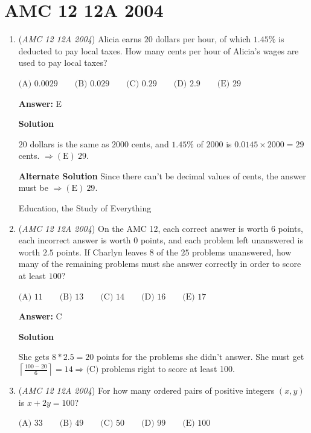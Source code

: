 \section{AMC 12 12A 2004}
        \begin{enumerate}
        	\item (\textit{AMC 12 12A 2004}) Alicia earns $20$ dollars per hour, of which $1.45\%$ is deducted to pay local taxes.  How many cents per hour of Alicia's wages are used to pay local taxes?


 $\text{(A) } 0.0029 \qquad \text{(B) } 0.029 \qquad \text{(C) } 0.29 \qquad \text{(D) } 2.9 \qquad \text{(E) } 29$

 \textbf{Answer: }E



\textbf{Solution}

$20$ dollars is the same as $2000$ cents, and $1.45\%$ of $2000$ is $0.0145\times2000=29$ cents. $\Rightarrow\boxed{\mathrm{(E)}\ 29}$.

 \textbf{Alternate Solution} Since there can't be decimal values of cents, the answer must be $\Rightarrow\boxed{\mathrm{(E)}\ 29}$. 

 Education, the Study of Everything

 


	\item (\textit{AMC 12 12A 2004}) On the AMC 12, each correct answer is worth $6$ points, each incorrect answer is worth $0$ points, and each problem left unanswered is worth $2.5$ points. If Charlyn leaves $8$ of the $25$ problems unanswered, how many of the remaining problems must she answer correctly in order to score at least $100$?


 $\text{(A) } 11 \qquad \text{(B) } 13 \qquad \text{(C) } 14 \qquad \text{(D) } 16 \qquad \text{(E) } 17$

 \textbf{Answer: }C



\textbf{Solution}

She gets $8*2.5=20$ points for the problems she didn't answer. She must get $\left\lceil \frac{100-20}{6} \right\rceil =14 \Rightarrow \text {(C)}$ problems right to score at least 100.

 


	\item (\textit{AMC 12 12A 2004}) For how many ordered pairs of positive integers $(x,y)$ is $x+2y=100$? 


 $\text{(A) } 33 \qquad \text{(B) } 49 \qquad \text{(C) } 50 \qquad \text{(D) } 99 \qquad \text{(E) } 100$


\end{enumerate}
